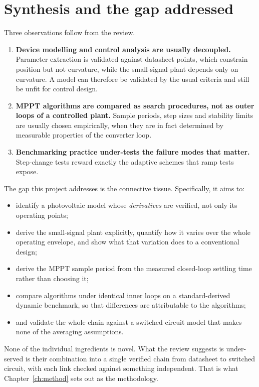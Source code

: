 \section{Synthesis and the gap addressed}
\label{sec:gap}

Three observations follow from the review.

\begin{enumerate}[leftmargin=1.6em]
  \item \textbf{Device modelling and control analysis are usually decoupled.}
        Parameter extraction is validated against datasheet points, which
        constrain position but not curvature, while the small-signal plant
        depends only on curvature. A model can therefore be validated by the
        usual criteria and still be unfit for control design.
  \item \textbf{MPPT algorithms are compared as search procedures, not as
        outer loops of a controlled plant.} Sample periods, step sizes and
        stability limits are usually chosen empirically, when they are in fact
        determined by measurable properties of the converter loop.
  \item \textbf{Benchmarking practice under-tests the failure modes that
        matter.} Step-change tests reward exactly the adaptive schemes that
        ramp tests expose.
\end{enumerate}

The gap this project addresses is the connective tissue. Specifically, it aims
to:

\begin{itemize}[leftmargin=1.4em]
  \item identify a photovoltaic model whose \emph{derivatives} are verified, not
        only its operating points;
  \item derive the small-signal plant explicitly, quantify how it varies over
        the whole operating envelope, and show what that variation does to a
        conventional design;
  \item derive the MPPT sample period from the measured closed-loop settling
        time rather than choosing it;
  \item compare algorithms under identical inner loops on a standard-derived
        dynamic benchmark, so that differences are attributable to the
        algorithms;
  \item and validate the whole chain against a switched circuit model that makes
        none of the averaging assumptions.
\end{itemize}

None of the individual ingredients is novel. What the review suggests is
under-served is their combination into a single verified chain from datasheet to
switched circuit, with each link checked against something independent. That is
what Chapter~\ref{ch:method} sets out as the methodology.
